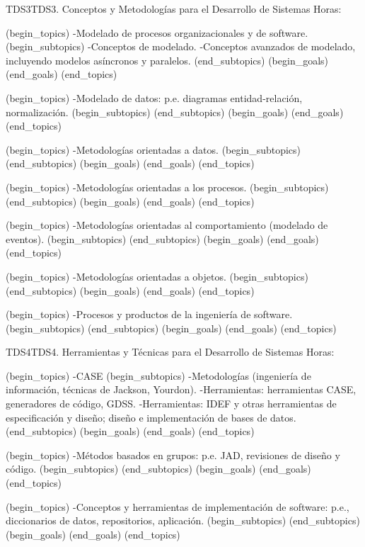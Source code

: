 \begin{BKL2}{TDS3}{TDS3. Conceptos y Metodologías para el Desarrollo de Sistemas}
Horas:
 
(begin_topics)
-Modelado de procesos organizacionales y de software.
(begin_subtopics)
-Conceptos de modelado.
-Conceptos avanzados de modelado, incluyendo modelos asíncronos y paralelos.
(end_subtopics)
(begin_goals)
(end_goals)
(end_topics)

 
(begin_topics)
-Modelado de datos: p.e. diagramas entidad-relación, normalización.
(begin_subtopics)
(end_subtopics)
(begin_goals)
(end_goals)
(end_topics)

 
(begin_topics)
-Metodologías orientadas a datos.
(begin_subtopics)
(end_subtopics)
(begin_goals)
(end_goals)
(end_topics)

 
(begin_topics)
-Metodologías orientadas a los procesos.
(begin_subtopics)
(end_subtopics)
(begin_goals)
(end_goals)
(end_topics)

 
(begin_topics)
-Metodologías orientadas al comportamiento (modelado de eventos).
(begin_subtopics)
(end_subtopics)
(begin_goals)
(end_goals)
(end_topics)

 

(begin_topics)
-Metodologías orientadas a objetos.
(begin_subtopics)
(end_subtopics)
(begin_goals)
(end_goals)
(end_topics)

 
(begin_topics)
-Procesos y productos de la ingeniería de software.
(begin_subtopics)
(end_subtopics)
(begin_goals)
(end_goals)
(end_topics)

\end{BKL2}



\begin{BKL2}{TDS4}{TDS4. Herramientas y Técnicas para el Desarrollo de Sistemas}
Horas:
 
(begin_topics)
-CASE
(begin_subtopics)
-Metodologías (ingeniería de información, técnicas de Jackson, Yourdon).
-Herramientas: herramientas CASE, generadores de código, GDSS.
-Herramientas: IDEF y otras herramientas de especificación y diseño; diseño e implementación de bases de datos.
(end_subtopics)
(begin_goals)
(end_goals)
(end_topics)

 
(begin_topics)
-Métodos basados en grupos: p.e. JAD, revisiones de diseño y código.
(begin_subtopics)
(end_subtopics)
(begin_goals)
(end_goals)
(end_topics)

 
(begin_topics)
-Conceptos y herramientas de implementación de software: p.e., diccionarios de datos, repositorios, aplicación.
(begin_subtopics)
(end_subtopics)
(begin_goals)
(end_goals)
(end_topics)

\end{BKL2}



